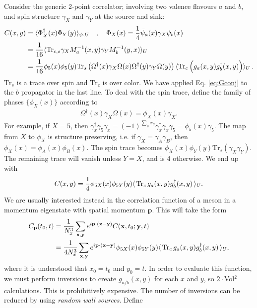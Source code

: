Consider the generic 2-point correlator; involving two valence flavours $a$ and $b$, and spin structure $\gamma_X$ and $\gamma_Y$ at the source and sink:
\begin{align}
  C(x,y) &= \langle \Phi^{\dagger}_X(x) \Phi_Y(y) \rangle_{\psi,U} \quad , \quad \Phi_X(x) = {1\over 4}\bar{\psi}_a(x) \gamma_X \psi_b(x) \\
  \nonumber
  &= {1\over 16}\langle \text{Tr}_{c,s} \gamma_X M^{-1}_{a}(x,y) \gamma_Y M^{-1}_{b}(y,x) \rangle_U \\
  &= {1\over 16}\phi_5(x)\phi_5(y)\text{Tr}_s \left( \Omega^{\dagger}(x) \gamma_X \Omega(x) \Omega^{\dagger}(y) \gamma_Y \Omega(y) \right)
  \langle \text{Tr}_c \left( g_{a}(x,y) g^{\dagger}_{b}(x,y) \right) \rangle_U\,. \nonumber
\end{align}
$\text{Tr}_s$ is a trace over spin and $\text{Tr}_c$ is over color. We have applied Eq. \eqref{eq:Gconj} to the $b$ propagator in the last line. To deal with the spin trace, define the family of phases $\{\phi_X(x)\}$ according to
\begin{align}
  \Omega^{\dagger}(x)\gamma_X\Omega(x) = \phi_X(x) \gamma_X.
\end{align}
For example, if $X=5$, then $\gamma^{\dagger}_x\gamma_5\gamma_x = (-1)^{\sum_{\mu}x_{\mu}} \gamma^{\dagger}_x\gamma_x \gamma_5 = \phi_5(x) \gamma_5$. The map from $X$ to $\phi_X$ is structure preserving, i.e. if $\gamma_X=\gamma_A\gamma_B$, then $\phi_X(x)=\phi_A(x)\phi_B(x)$. The spin trace becomes $\phi_X(x)\phi_Y(y) \text{Tr}_s\left( \gamma_X \gamma_Y \right)$. The remaining trace will vanish unless $Y=X$, and is 4 otherwise. We end up with
\begin{align}
  C(x,y) = {1\over 4} \phi_{5X}(x)\phi_{5Y}(y) \langle \,\text{Tr}_c \,g_a(x,y) g^{\dagger}_b(x,y) \,\rangle_U.
\end{align}
We are usually interested instead in the correlation function of a meson in a momentum eigenstate with spatial momentum ${\textbf{p}}$. This will take the form
\begin{align}
  \nonumber
  C_{\textbf{p}}(t_0,t) &= {1\over N_x^3} \sum_{{\textbf{x}},{\textbf{y}}} e^{i{\textbf{p}}\cdot({\textbf{x}}-{\textbf{y}})}
  C({\textbf{x}},t_0;{\textbf{y}},t) \\
  &= {1\over 4 N_x^3} \sum_{{\textbf{x}},{\textbf{y}}} e^{i{\textbf{p}}\cdot({\textbf{x}}-{\textbf{y}})} \phi_{5X}(x)\phi_{5Y}(y) \langle \,\text{Tr}_c \,g_a(x,y)g^{\dagger}_b(x,y)\,\rangle_U,
\end{align}
where it is understood that $x_0=t_0$ and $y_0=t$. In order to evaluate this function, we must perform inversions to create $g_{a/b}(x,y)$ for each $x$ and $y$, so $2\cdot$Vol$^2$ calculations. This is prohibitively expensive. The number of inversions can be reduced by using {\it{random wall sources}}. Define
